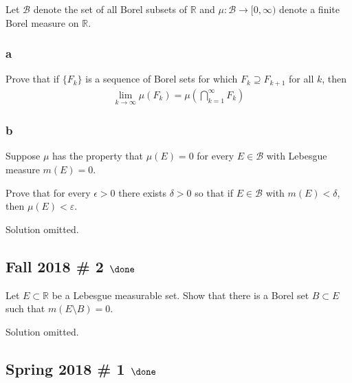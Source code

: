 Let \(\mathcal B\) denote the set of all Borel subsets of
\({\mathbb{R}}\) and \(\mu : \mathcal B \to [0, \infty)\) denote a
finite Borel measure on \({\mathbb{R}}\).

\hypertarget{a-2}{%
\subsubsection{a}\label{a-2}}

Prove that if \(\{F_k\}\) is a sequence of Borel sets for which
\(F_k \supseteq F_{k+1}\) for all \(k\), then
\begin{align*}
\lim _{k \rightarrow \infty} \mu\left(F_{k}\right)=\mu\left(\bigcap_{k=1}^{\infty} F_{k}\right)
\end{align*}

\hypertarget{b-2}{%
\subsubsection{b}\label{b-2}}

Suppose \(\mu\) has the property that \(\mu (E) = 0\) for every
\(E \in \mathcal B\) with Lebesgue measure \(m(E) = 0\).

Prove that for every \(\epsilon > 0\) there exists \(\delta > 0\) so
that if \(E \in \mathcal B\) with \(m(E) < δ\), then \(\mu(E) < ε\).


Solution omitted.


\hypertarget{fall-2018-2-done}{%
\subsection{\texorpdfstring{Fall 2018 \# 2
\(\done\)}{Fall 2018 \# 2 \textbackslash done}}\label{fall-2018-2-done}}

Let \(E\subset {\mathbb{R}}\) be a Lebesgue measurable set. Show that
there is a Borel set \(B \subset E\) such that \(m(E\setminus B) = 0\).


Solution omitted.

\hypertarget{spring-2018-1-done}{%
\subsection{\texorpdfstring{Spring 2018 \# 1
\(\done\)}{Spring 2018 \# 1 \textbackslash done}}\label{spring-2018-1-done}}

